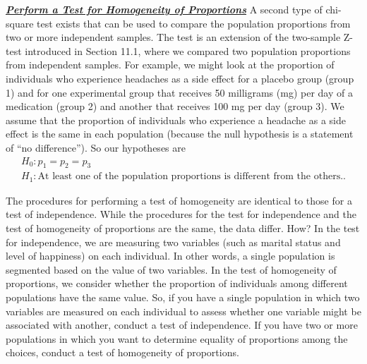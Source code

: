 \documentclass{report}
\begin{document}

        \pagebreak \bigbreak \noindent 
        \textbf{\textit{\underline{ Perform a Test for Homogeneity of Proportions}}}
        \bigbreak \noindent 
        A second type of chi-square test exists that can be used to compare the population proportions from two or more independent samples. The test is an extension of the two-sample Z-test introduced in Section 11.1, where we compared two population proportions from independent samples.
        \bigbreak \noindent 
        For example, we might look at the proportion of individuals who experience headaches as a side effect for a placebo group (group 1) and for one experimental group that receives 50 milligrams (mg) per day of a medication (group 2) and another that receives 100 mg per day (group 3). We assume that the proportion of individuals who experience a headache as a side effect is the same in each population (because the null hypothesis is a statement of “no difference”). So our hypotheses are
        \begin{align*}
            H_0: p_1 = p_2 = p_3 \\
            H_1: \text{At least one of the population proportions is different from the others.}
        .\end{align*}

        \bigbreak \noindent 
        The procedures for performing a test of homogeneity are identical to those for a test of independence.
        \bigbreak \noindent 
        While the procedures for the test for independence and the test of homogeneity of proportions are the same, the data differ. How?
        \bigbreak \noindent 
        In the test for independence, we are measuring two variables (such as marital status and level of happiness) on each individual. In other words, a single population is segmented based on the value of two variables.
        \bigbreak \noindent 
        In the test of homogeneity of proportions, we consider whether the proportion of individuals among different populations have the same value.
        \bigbreak \noindent 
        So, if you have a single population in which two variables are measured on each individual to assess whether one variable might be associated with another, conduct a test of independence. If you have two or more populations in which you want to determine equality of proportions among the choices, conduct a test of homogeneity of proportions.
\end{document}
